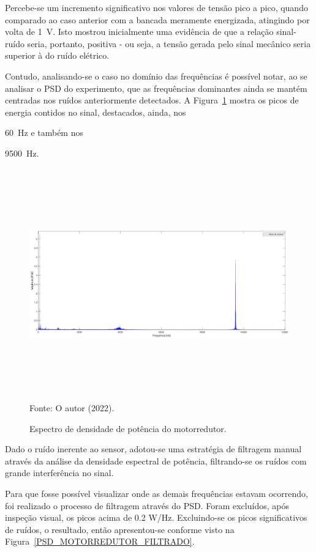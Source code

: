 \documentclass[
	12pt,				
	oneside,			
	a4paper,			
	english,			
	brazil,			
	]{abntex2ppgsi}
\begin{document}
{{{{{Percebe-se um incremento significativo nos valores de tensão pico a pico, quando comparado ao caso anterior com a bancada meramente energizada, atingindo por volta de {\SI{1}{\volt}}. Isto mostrou inicialmente uma evidência de que a relação sinal-ruído seria, portanto, positiva - ou seja, a tensão gerada pelo sinal mecânico seria superior à do ruído elétrico. 

Contudo, analisando-se o caso no domínio das frequências é possível notar, ao se analisar o PSD do experimento, que as frequências dominantes ainda se mantém centradas nos ruídos anteriormente detectados. A Figura~\ref{PSD_MOTORREDUTOR} mostra os picos de energia contidos no sinal, destacados, ainda, nos {\SI{60}{\hertz} e também nos {\SI{9500}{\hertz}.

\begin{figure}[H]
\centering
\caption {Espectro de densidade de potência do motorredutor.}
\includegraphics[width=\textwidth,height=100mm,keepaspectratio]{Caso0/PSD_MOTORREDUTOR} \\
Fonte: O autor (2022).
\label{PSD_MOTORREDUTOR}
\end{figure}

Dado o ruído inerente ao sensor, adotou-se uma estratégia de filtragem manual através da análise da densidade espectral de potência, filtrando-se os ruídos com grande interferência no sinal.

Para que fosse possível visualizar onde as demais frequências estavam ocorrendo, foi realizado o processo de filtragem através do PSD. Foram excluídos, após inspeção visual, os picos acima de 0.2 W/Hz. Excluindo-se os picos significativos de ruídos, o resultado, então apresentou-se conforme visto na Figura~\ref{PSD_MOTORREDUTOR_FILTRADO}. 

}}}}}}}
\end{document}
